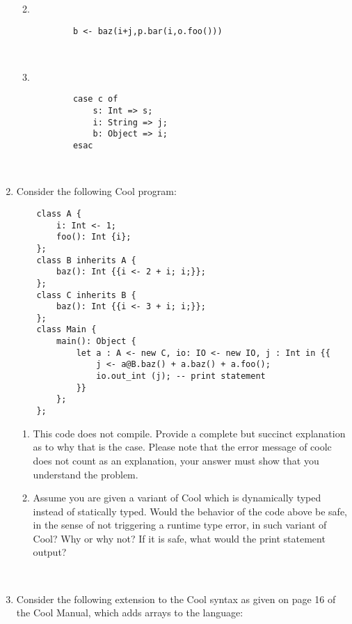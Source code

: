 \documentclass[11pt]{article}
\begin{document}
\begin{enumerate}
\begin{enumerate}
        \newpage
    \item  \ 
    \begin{lstlisting}
        b <- baz(i+j,p.bar(i,o.foo()))
    \end{lstlisting}\\
        \newpage
    \item   \ 
    \begin{lstlisting}
        case c of
            s: Int => s;
            i: String => j;
            b: Object => i;
        esac
    \end{lstlisting}
  \end{enumerate}\\
    \newpage
  

  \item Consider the following Cool program:
   \begin{lstlisting}
    class A {
        i: Int <- 1;
        foo(): Int {i};
    };
    class B inherits A {
        baz(): Int {{i <- 2 + i; i;}};
    };
    class C inherits B {
        baz(): Int {{i <- 3 + i; i;}};
    };
    class Main {
        main(): Object {
            let a : A <- new C, io: IO <- new IO, j : Int in {{
                j <- a@B.baz() + a.baz() + a.foo();
                io.out_int (j); -- print statement
            }}
        };
    };
    \end{lstlisting}
    \begin{enumerate}
        \item This code does not compile. Provide a complete but succinct explanation as to why that is the case. Please note that the error message of coolc does not count as an explanation, your answer must show that you understand the problem. \\
        \newpage
        \item Assume you are given a variant of Cool which is dynamically typed instead of statically typed. Would the behavior of the code above be safe, in the sense of not triggering a runtime type error, in such variant of Cool? Why or why not? If it is safe, what would the print statement output?

    \end{enumerate} \\
        \newpage
  \item  Consider the following extension to the Cool syntax as given on page 16 of the Cool Manual, which adds arrays to the language:
  

\end{enumerate}
\end{document}
